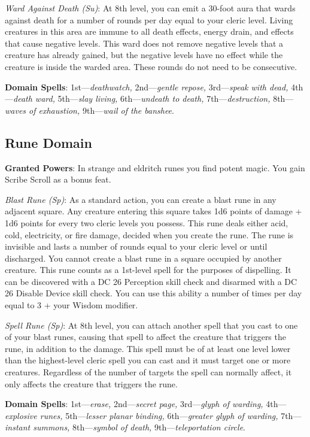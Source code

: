 \textit{Ward Against Death (Su)}: At 8th level, you can emit a 30-foot aura that wards against death for a number
of rounds per day equal to your cleric level. Living creatures in this area are immune to all death effects,
energy drain, and effects that cause negative levels. This ward does not remove negative levels that a creature
has already gained, but the negative levels have no effect while the creature is inside the warded area. These
rounds do not need to be consecutive.

\textbf{Domain Spells}: 1st---\textit{deathwatch, }2nd---\textit{gentle repose,} 3rd---\textit{speak with dead, }4th---\textit{death ward, }5th---\textit{slay living, }6th---\textit{undeath to death, }7th---\textit{destruction, }8th---\textit{waves of exhaustion, }9th---\textit{wail of the banshee}.

\subsection{Rune Domain}


\textbf{Granted Powers}: In strange and eldritch runes you find potent magic. You gain Scribe Scroll as a bonus feat.

\textit{Blast Rune (Sp)}: As a standard action, you can create a blast rune in any adjacent square. Any creature 
entering this square takes 1d6 points of damage + 1d6 points for every two cleric levels you possess. This rune deals
either acid, cold, electricity, or fire damage, decided when you create the rune. The rune is invisible and lasts
a number of rounds equal to your cleric level or until discharged. You cannot create a blast rune in a square
occupied by another creature. This rune counts as a 1st-level spell for the purposes of dispelling. It can be 
discovered with a DC 26 Perception skill check and disarmed with a DC 26 Disable Device skill check. You can use
this ability a number of times per day equal to 3 + your Wisdom modifier.

\textit{Spell Rune (Sp)}: At 8th level, you can attach another spell that you cast to one of your blast runes, 
causing that spell to affect the creature that triggers the rune, in addition to the damage. This spell must be 
of at least one level lower than the highest-level cleric spell you can cast and it must target one or more 
creatures. Regardless of the number of targets the spell can normally affect, it only affects the creature that 
triggers the rune.
				
\textbf{Domain Spells}: 1st---\textit{erase, }2nd---\textit{secret page,} 3rd---\textit{glyph of warding, }4th---\textit{explosive runes, }5th---\textit{lesser planar binding, }6th---\textit{greater glyph of warding, }7th---\textit{instant summons, }8th---\textit{symbol of death, }9th---\textit{teleportation circle}.
				
